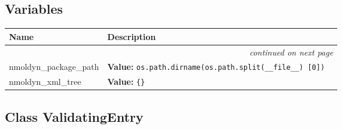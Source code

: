 
  \subsection{Variables}

    \vspace{-1cm}
\hspace{\varindent}\begin{longtable}{|p{\varnamewidth}|p{\vardescrwidth}|l}
\cline{1-2}
\cline{1-2} \centering \textbf{Name} & \centering \textbf{Description}& \\
\cline{1-2}
\endhead\cline{1-2}\multicolumn{3}{r}{\small\textit{continued on next page}}\\\endfoot\cline{1-2}
\endlastfoot\raggedright n\-m\-o\-l\-d\-y\-n\-\_\-p\-a\-c\-k\-a\-g\-e\-\_\-p\-a\-t\-h\- & \raggedright \textbf{Value:} 
{\tt os.path.dirname(os.path.split(\_\_file\_\_) [0])}&\\
\cline{1-2}
\raggedright n\-m\-o\-l\-d\-y\-n\-\_\-x\-m\-l\-\_\-t\-r\-e\-e\- & \raggedright \textbf{Value:} 
{\tt \{\}}&\\
\cline{1-2}
\end{longtable}



\subsection{Class ValidatingEntry}

